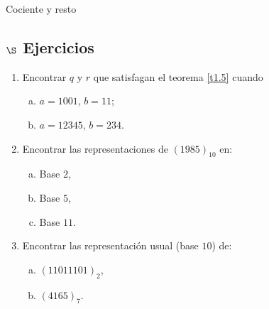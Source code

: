 \begin{section}{Cociente y resto}
\subsection*{\Large $\S$ Ejercicios}
\begin{enumerate}[1)]
\item Encontrar $q$ y $r$ que satisfagan el teorema \ref{t1.5} cuando
\begin{enumerate}[a)]
	\item $a = 1001$, \qquad $b = 11$;
	
	\item $a = 12345$, \qquad $b = 234$.
\end{enumerate}


\item Encontrar las representaciones de $(1985)_{10}$ en:
\begin{enumerate}[a)]
	\item Base $2$,
	
	\item Base $5$,
	
	\item Base $11$.
\end{enumerate}

\item  Encontrar las representación usual (base $10$) de:
\begin{enumerate}[a)]
	\item $(11011101)_2$,
	
	\item $(4165)_7.$
\end{enumerate}
 
\end{enumerate}
\end{section}


